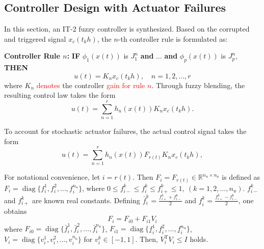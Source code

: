 \documentclass[preprint,review,fleqn,sort&compress,3p]{elsarticle}
\theoremstyle{definition} %
\theoremstyle{definition}%
\begin{document}
	\subsection{Controller Design with Actuator Failures}
	In this section, an IT-2 fuzzy controller is synthesized. Based on the corrupted and triggered signal $x_c(t_k h)$, the $n$-th controller rule is formulated as:
	
	\textbf{Controller Rule $n$:} 
	\textbf{IF} $\phi_1(x(t))$ is $J^{n}_1$ \textbf{and} $\dots$ \textbf{and} $\phi_p(x(t))$ is $J^{n}_p$, \textbf{THEN}
	\begin{equation} 
		u(t) = K_{n} x_c(t_{k} h), \quad n = 1, 2, \ldots, r
	\end{equation}
	where $K_n$ \textcolor{red}{denotes} the controller \textcolor{red}{gain for rule $n$}. Through fuzzy blending, the resulting control law takes the form
	\begin{equation} 
		u(t) = \sum_{n=1}^{r} h_n(x(t)) K_{n} x_c(t_k h).
	\end{equation}
	
	To account for stochastic actuator failures, the actual control signal takes the form
	\begin{equation}\label{eq:local_controller}
		u(t) = \sum_{n=1}^{r} h_n(x(t)) F_{r(t)} K_{n} x_c(t_k h),
	\end{equation}
	
	For notational convenience, let $i = r(t)$. 
	Then $F_i = F_{r(t)} \in \mathbb{R}^{n_u \times n_u}$ is defined as $F_i = \operatorname{diag}\{f_{i}^1, f_{i}^2, \ldots, f_{i}^{n_u}\}$, where $0 \le f_{i-}^{k} \le f_{i}^{k} \le f_{i+}^{k} \le 1,\ (k = 1,2,\ldots,n_u)$. $f_{i-}^{k}$ and $f_{i+}^{k}$ are known real constants. 
	Defining $\bar{f}_{i}^{k} = \frac{f_{i+}^{k} + f_{i-}^{k}}{2}$ and $\underline{f}_{i}^{k} = \frac{f_{i+}^{k} - f_{i-}^{k}}{2}$, one obtains
	\begin{equation}\label{F_i01}
		F_{i}= F_{i0}+F_{i1} V_{i}
	\end{equation}
	where $F_{i0} = \operatorname{diag}\{\bar{f}_{i}^{1}, \bar{f}_{i}^{2}, \ldots, \bar{f}_{i}^{n_u}\}$, $F_{i1} = \operatorname{diag}\{\underline{f}_{i}^{1}, \underline{f}_{i}^{2}, \ldots, \underline{f}_{i}^{n_u}\}$, $V_i = \operatorname{diag}\{v_{i}^{1}, v_{i}^{2}, \ldots, v_{i}^{n_u}\}$ for $v_i^k \in [-1,1]$. Then, $V_i^\mathrm{T}V_i \le I$ holds.
	
\end{document}
